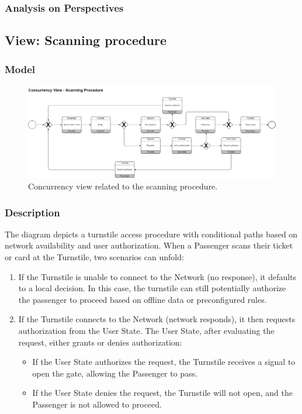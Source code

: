 \subsubsection{Analysis on Perspectives}
\subsection{View: Scanning procedure}
\subsubsection{Model}
\begin{figure}[H]
    \centering
    \includegraphics[width=\textwidth]{drawings/views_final_version/concurrency_view_2.png}
    \caption{Concurrency view related to the scanning procedure.}
    \label{fig:concurrency_view_2}
\end{figure}

\subsubsection{Description}
The diagram depicts a turnstile access procedure with conditional paths based on network availability and user authorization. When a Passenger scans their ticket or card at the Turnstile, two scenarios can unfold:

\begin{enumerate}
    \item If the Turnstile is unable to connect to the Network (no response), it defaults to a local decision. In this case, the turnstile can still potentially authorize the passenger to proceed based on offline data or preconfigured rules.
    \item If the Turnstile connects to the Network (network responds), it then requests authorization from the User State. The User State, after evaluating the request, either grants or denies authorization:
    \begin{itemize}
        \item If the User State authorizes the request, the Turnstile receives a signal to open the gate, allowing the Passenger to pass.
        \item If the User State denies the request, the Turnstile will not open, and the Passenger is not allowed to proceed.
    \end{itemize}
\end{enumerate}

